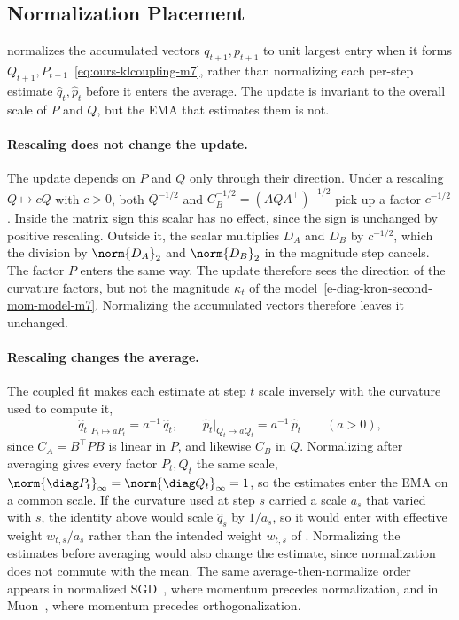 \subsection{Normalization Placement}
\label{sec:scale-placement-m7}
\methodname{} normalizes the accumulated vectors $q_{t+1},p_{t+1}$ to unit
largest entry when it forms $Q_{t+1},P_{t+1}$~\eqref{eq:ours-klcoupling-m7},
rather than normalizing each per-step estimate $\hat{q}_t,\hat{p}_t$ before
it enters the average. The update is invariant to the overall scale of $P$
and $Q$, but the EMA that estimates them is not.

\paragraph{Rescaling does not change the update.} The update depends on
$P$ and $Q$ only through their direction. Under a rescaling $Q\mapsto cQ$ with
$c>0$, both $Q^{-1/2}$ and $C_B^{-1/2}=(AQA^\top)^{-1/2}$ pick up a factor
$c^{-1/2}$. Inside the matrix sign this scalar has no effect, since the sign
is unchanged by positive rescaling. Outside it, the scalar multiplies $D_A$
and $D_B$ by $c^{-1/2}$, which the division by $\norm{D_A}_2$ and
$\norm{D_B}_2$ in the magnitude step cancels. The factor $P$ enters the same
way. The update therefore sees the direction of the curvature factors, but
not the magnitude $\kappa_t$ of the
model~\eqref{e-diag-kron-second-mom-model-m7}. Normalizing the accumulated
vectors therefore leaves it unchanged.

\paragraph{Rescaling changes the average.} The coupled fit makes each
estimate at step $t$ scale inversely with the curvature used to compute it,
\[
  \hat{q}_t\big|_{P_t\mapsto aP_t}=a^{-1}\,\hat{q}_t,
  \qquad
  \hat{p}_t\big|_{Q_t\mapsto aQ_t}=a^{-1}\,\hat{p}_t
  \qquad(a>0),
\]
since $C_A=B^\top PB$ is linear in $P$, and likewise $C_B$ in $Q$.
Normalizing after averaging gives every factor $P_t,Q_t$ the same scale,
$\norm{\diag P_t}_\infty=\norm{\diag Q_t}_\infty=1$, so the estimates enter
the EMA on a common scale. If the curvature used at step $s$
carried a scale $a_s$ that varied with $s$, the identity above would scale
$\hat{q}_s$ by $1/a_s$, so it would enter with effective weight
$w_{t,s}/a_s$ rather than the intended weight $w_{t,s}$ of
. Normalizing the estimates before
averaging would also change the estimate, since normalization does not
commute with the mean. The same average-then-normalize order appears in
normalized SGD~\cite{cutkosky_nigt}, where momentum precedes normalization,
and in Muon~\cite{denoise_ortho}, where momentum precedes orthogonalization.
